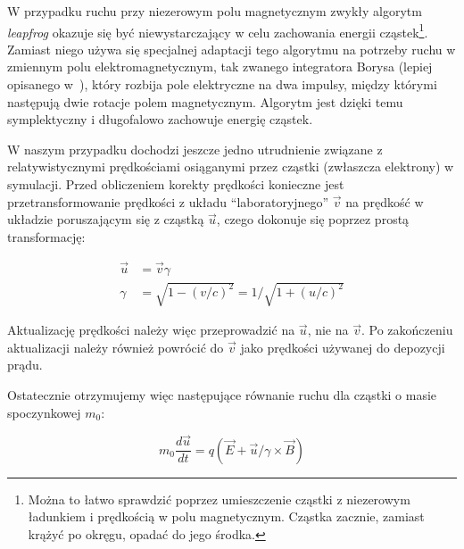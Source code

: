 W przypadku ruchu przy niezerowym polu magnetycznym zwykły algorytm
\emph{leapfrog} okazuje się być niewystarczający w celu zachowania energii
cząstek\footnote{Można to łatwo sprawdzić poprzez umieszczenie cząstki z
niezerowym ładunkiem i prędkością w polu magnetycznym. Cząstka zacznie, zamiast
krążyć po okręgu, opadać do jego środka.}.  Zamiast niego używa
się specjalnej adaptacji tego algorytmu na potrzeby ruchu w zmiennym polu
elektromagnetycznym, tak zwanego integratora Borysa (lepiej opisanego
w~\cite{birdsall}), który rozbija pole elektryczne na dwa impulsy, między
którymi następują dwie rotacje polem magnetycznym. Algorytm jest dzięki temu
symplektyczny i długofalowo zachowuje energię cząstek.

W naszym przypadku dochodzi jeszcze jedno utrudnienie związane z
relatywistycznymi prędkościami osiąganymi przez cząstki (zwłaszcza
elektrony) w symulacji. Przed obliczeniem korekty prędkości konieczne jest
przetransformowanie prędkości z układu ``laboratoryjnego'' $\vec{v}$ na
prędkość w układzie poruszającym się z cząstką $\vec{u}$, czego dokonuje
się poprzez prostą transformację:

\begin{align}
    \vec{u} &= \vec{v} \gamma \\
    \gamma &= \sqrt{1-{(v/c)}^2} = 1/\sqrt{1+{(u/c)}^2}
    \label{eqn:gamma-transformation}
\end{align}


Aktualizację prędkości należy więc przeprowadzić na $\vec{u}$, nie na
$\vec{v}$. Po zakończeniu
aktualizacji należy również powrócić do $\vec{v}$ jako prędkości używanej
do depozycji prądu.

Ostatecznie otrzymujemy więc następujące równanie ruchu dla cząstki o masie spoczynkowej $m_0$:

\begin{equation}
m_0 \frac{d \vec{u}}{dt} = q \left( \vec{E} + \vec{u} / \gamma \times \vec{B} \right)
\label{eqn:relativistic-eqn-motion}
\end{equation}


